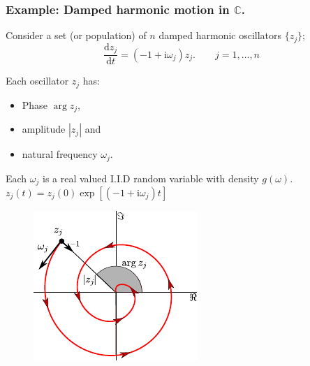 \documentclass[10pt,reqno]{beamer}
\newcommand{\D}[2]{\frac{\mathrm{d} #1}{\mathrm{d} #2}}
\newcommand{\I}{\mathrm{i}}
\newcommand{\complex}{\mathbb{C}}
\begin{document}
\begin{frame}[t]
\frametitle{Example: Damped harmonic motion in $\complex$.} 
Consider a set (or population) of $n$ damped harmonic oscillators $\{z_j\}$;
\[
\D{z_j}{t} =(-1+\I\omega_j)z_j. \qquad j=1,\ldots,n
\] 
\begin{minipage}{0.49\textwidth}

\vspace{0.5cm}
Each oscillator $z_j$ has:
\begin{itemize}
	\item Phase $\arg{z_j}$,
	\item amplitude $|z_j|$ and 
	\item natural frequency $\omega_j$.
\end{itemize}

Each $\omega_j$ is a real valued I.I.D random variable with density $g(\omega)$.\\

$z_j(t) = z_j(0)\exp[(-1+\I\omega_j)t]$
\end{minipage}
\begin{minipage}{0.49\textwidth}
	\begin{figure}
		\includegraphics{dosc}
	\end{figure}
	\centering

\end{minipage}
\end{frame}
\end{document}
